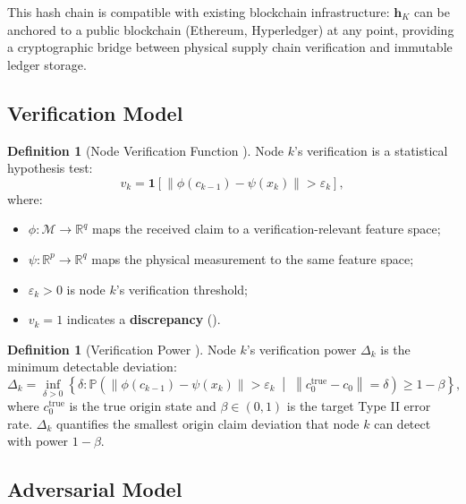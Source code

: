 \documentclass[11pt,a4paper]{article}
\theoremstyle{definition}
\newtheorem{definition}[theorem]{Definition}
\theoremstyle{remark}
\newcommand{\R}{\mathbb{R}}
\newcommand{\Pbb}{\mathbb{P}}
\newcommand{\ind}[1]{\mathbf{1}[#1]}
\newcommand{\norm}[1]{\left\lVert#1\right\rVert}
\newcommand{\claimSpace}{\mathcal{M}}
\newcommand{\hashChain}{\mathbf{h}}
\begin{document}
This hash chain is compatible with existing blockchain infrastructure: $\hashChain_K$ can be anchored to a public blockchain (Ethereum, Hyperledger) at any point, providing a cryptographic bridge between physical supply chain verification and immutable ledger storage.

\subsection{Verification Model }

\begin{definition}[Node Verification Function ]
\label{def:verification}
Node $k$'s verification is a statistical hypothesis test:
\begin{equation}
    v_k = \ind{\norm{\phi(c_{k-1}) - \psi(x_k)} > \varepsilon_k},
    \label{eq:verification}
\end{equation}
where:
\begin{itemize}
    \item $\phi: \claimSpace \to \R^q$ maps the received claim to a verification-relevant feature space;
    \item $\psi: \R^p \to \R^q$ maps the physical measurement to the same feature space;
    \item $\varepsilon_k > 0$ is node $k$'s verification threshold;
    \item $v_k = 1$ indicates a \textbf{discrepancy} ().
\end{itemize}
\end{definition}

\begin{definition}[Verification Power ]
\label{def:verification_power}
Node $k$'s verification power $\Delta_k$ is the minimum detectable deviation:
\begin{equation}
    \Delta_k = \inf_{\delta > 0} \left\{ \delta : \Pbb\left(\norm{\phi(c_{k-1}) - \psi(x_k)} > \varepsilon_k \;\middle|\; \norm{c_0^{\text{true}} - c_0} = \delta\right) \geq 1 - \beta \right\},
    \label{eq:verification_power}
\end{equation}
where $c_0^{\text{true}}$ is the true origin state and $\beta \in (0,1)$ is the target Type II error rate. $\Delta_k$ quantifies the smallest origin claim deviation that node $k$ can detect with power $1 - \beta$.
\end{definition}

\subsection{Adversarial Model }
\end{document}
